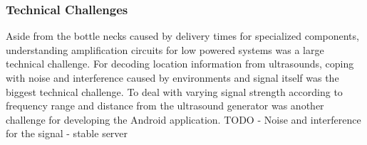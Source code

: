 \subsubsection{Technical Challenges}
\label{sec:technical-challenges}
Aside from the bottle necks caused by delivery times for specialized components, understanding amplification circuits for low powered systems was a large technical challenge.
For decoding location information from ultrasounds, coping with noise and interference caused by environments and signal itself was the biggest technical challenge. To deal with varying signal strength according to frequency range and distance from the ultrasound generator was another challenge for developing the Android application.
TODO
 - Noise and interference for the signal   
- stable server 

